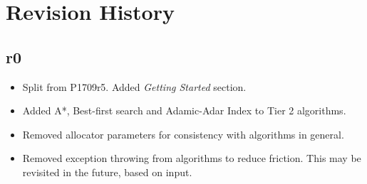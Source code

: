 \section{Revision History}

\subsection*{\paperno r0}

\begin{itemize}
      \item Split from P1709r5. Added \textit{Getting Started} section.
      \item Added A*, Best-first search and Adamic-Adar Index to Tier 2 algorithms.
      \item Removed allocator parameters for consistency with algorithms in general.
      \item Removed exception throwing from algorithms to reduce friction. 
            This may be revisited in the future, based on input.
\end{itemize}
